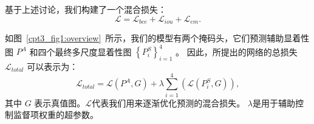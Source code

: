 %
%
%
%
%
%
基于上述讨论，我们构建了一个混合损失：
%
%
%
\begin{equation} 
	\mathcal L = \mathcal L_{bce} + \mathcal L_{iou}  + \mathcal L_{em}  .
\end{equation}
%
%
%
%
\par
%
%
如图~\ref{cpt3_fig1:overview}~所示，我们的模型有两个掩码头，它们预测辅助显着性图 $ P^{A} $ 和四个最终多尺度显着性图 $ \left \{ P_{i}^{S} \right \}_{i=1}^{4} $ 。 因此，所提出的网络的总损失 $ \mathcal L_{total} $ 可以表示为： 
%
\begin{equation}
	\mathcal L_{total} = \mathcal L\left ( P^{A}, G \right ) + \lambda  \sum_{i=1}^{4} \left ( \mathcal L \left (  P_{i}^{S},G \right )\right ),
\end{equation}
%
%
%
其中 $ G $ 表示真值图。$ \mathcal L $代表我们用来逐渐优化预测的混合损失。 $ \lambda $是用于辅助控制监督项权重的超参数。
























